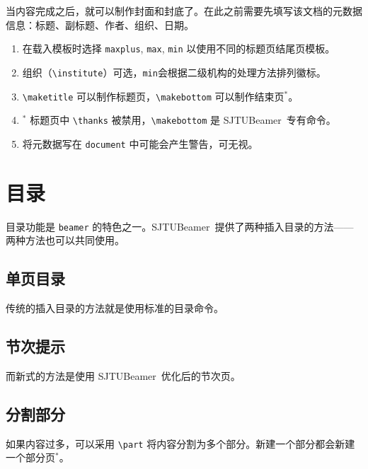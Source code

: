 \documentclass[
    UTF8,
    heading=true,
    12pt,
    a4paper
]{ctexrep}
\def\themename{\textsf{SJTUBeamer}}
\begin{document}
    当内容完成之后，就可以制作封面和封底了。在此之前需要先填写该文档的元数据信息：标题、副标题、作者、组织、日期。


    \begin{enumerate}
        \small
        \item 在载入模板时选择 \texttt{maxplus}, \texttt{max}, \texttt{min} 以使用不同的标题页结尾页模板。
        \item 组织（\texttt{\textbackslash{}institute}）可选，\texttt{min}会根据二级机构的处理方法排列徽标。
        \item \texttt{\textbackslash{}maketitle} 可以制作标题页，\texttt{\textbackslash{}makebottom} 可以制作结束页$^*$。
        \item$^*$ 标题页中 \texttt{\textbackslash{}thanks} 被禁用，\texttt{\textbackslash{}makebottom} 是 \themename\ 专有命令。
        \item[\faWarning] 将元数据写在 \texttt{document} 中可能会产生警告，可无视。
    \end{enumerate}

    \chapter{目录}
    
    目录功能是 \texttt{beamer} 的特色之一。\themename\ 提供了两种插入目录的方法——两种方法也可以共同使用。

    \section{单页目录}

    传统的插入目录的方法就是使用标准的目录命令。


    \section{节次提示}

    而新式的方法是使用 \themename\ 优化后的节次页。


    \section{分割部分}

    如果内容过多，可以采用 \texttt{\textbackslash{}part} 将内容分割为多个部分。新建一个部分都会新建一个部分页$^*$。
\end{document}
